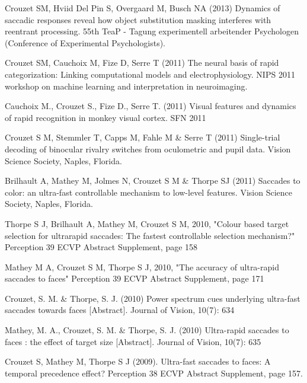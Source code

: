 \documentclass[margin,line]{resume}
\begin{document}
\begin{resume}
\footnotesize %

Crouzet SM, Hviid Del Pin S, Overgaard M, Busch NA (2013) Dynamics of saccadic responses reveal how object substitution masking interferes with reentrant processing. 55th TeaP - Tagung experimentell arbeitender Psychologen (Conference of Experimental Psychologists).

\vspace{-2mm} Crouzet SM, Cauchoix M, Fize D, Serre T (2011) The neural basis of rapid categorization: Linking computational models and electrophysiology. NIPS 2011 workshop on machine learning and interpretation in neuroimaging.

\vspace{-2mm} Cauchoix M., Crouzet S., Fize D., Serre T. (2011) Visual features and dynamics of rapid recognition in monkey visual cortex. SFN 2011

\vspace{-2mm} Crouzet S M, Stemmler T, Capps M, Fahle M \& Serre T (2011) Single-trial decoding of binocular rivalry switches from oculometric and pupil data. Vision Science Society, Naples, Florida.

\vspace{-2mm} Brilhault A, Mathey M, Jolmes N, Crouzet S M \& Thorpe SJ (2011) Saccades to color: an ultra-fast controllable mechanism to low-level features. Vision Science Society, Naples, Florida.

\vspace{-2mm} Thorpe S J, Brilhault A, Mathey M, Crouzet S M, 2010, "Colour based target selection for ultrarapid saccades: The fastest controllable selection mechanism?" Perception 39 ECVP Abstract Supplement, page 158

\vspace{-2mm} Mathey M A, Crouzet S M, Thorpe S J, 2010, "The accuracy of ultra-rapid saccades to faces" Perception 39 ECVP Abstract Supplement, page 171

\vspace{-2mm} Crouzet, S. M. \& Thorpe, S. J. (2010) Power spectrum cues underlying ultra-fast saccades towards faces [Abstract]. Journal of Vision, 10(7): 634

\vspace{-2mm} Mathey, M. A., Crouzet, S. M. \& Thorpe, S. J. (2010) Ultra-rapid saccades to faces : the effect of target size [Abstract]. Journal of Vision, 10(7): 635

\vspace{-2mm} Crouzet S, Mathey M, Thorpe S J (2009). Ultra-fast saccades to faces: A temporal precedence effect? Perception 38 ECVP Abstract Supplement, page 157.


\end{resume}
\end{document}
